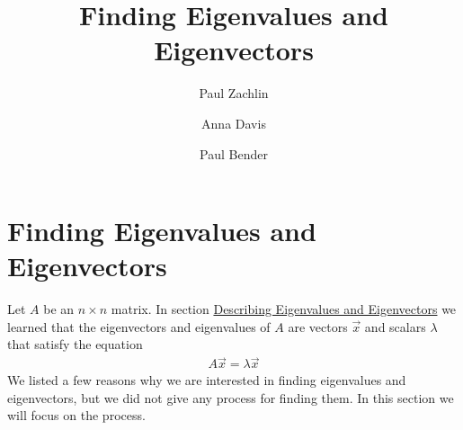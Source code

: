 \documentclass{ximera}
\author{Paul Zachlin \and Anna Davis \and Paul Bender} \title{Finding Eigenvalues and Eigenvectors} \license{CC-BY 4.0}
\begin{document}
\begin{abstract}

\end{abstract}
\maketitle
\section*{Finding Eigenvalues and Eigenvectors}
Let $A$ be an $n \times n$ matrix.  In section \href{https://ximera.osu.edu/oerlinalg/LinearAlgebra/EIG-0010/main}{Describing Eigenvalues and Eigenvectors} we learned that the eigenvectors and eigenvalues of $A$ are vectors $\vec{x}$ and scalars $\lambda$ that satisfy the equation 
\begin{align}\label{def:eigen} A \vec{x} = \lambda \vec{x}\end{align}
We listed a few reasons why we are interested in finding eigenvalues and eigenvectors, but we did not give any process for finding them.  In this section we will focus on the process.
\end{document}
